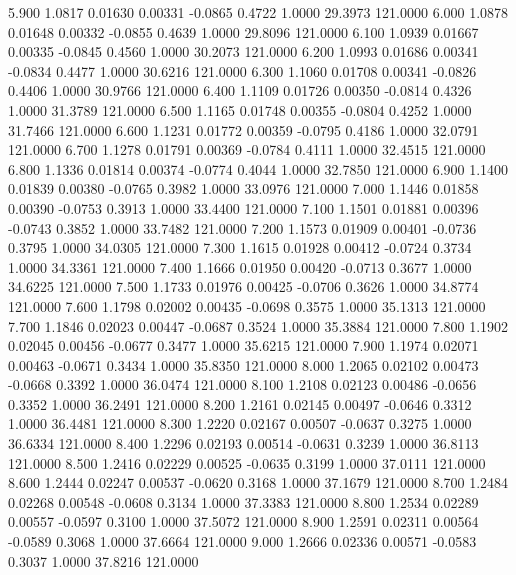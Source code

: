    5.900   1.0817   0.01630   0.00331  -0.0865   0.4722   1.0000  29.3973 121.0000
   6.000   1.0878   0.01648   0.00332  -0.0855   0.4639   1.0000  29.8096 121.0000
   6.100   1.0939   0.01667   0.00335  -0.0845   0.4560   1.0000  30.2073 121.0000
   6.200   1.0993   0.01686   0.00341  -0.0834   0.4477   1.0000  30.6216 121.0000
   6.300   1.1060   0.01708   0.00341  -0.0826   0.4406   1.0000  30.9766 121.0000
   6.400   1.1109   0.01726   0.00350  -0.0814   0.4326   1.0000  31.3789 121.0000
   6.500   1.1165   0.01748   0.00355  -0.0804   0.4252   1.0000  31.7466 121.0000
   6.600   1.1231   0.01772   0.00359  -0.0795   0.4186   1.0000  32.0791 121.0000
   6.700   1.1278   0.01791   0.00369  -0.0784   0.4111   1.0000  32.4515 121.0000
   6.800   1.1336   0.01814   0.00374  -0.0774   0.4044   1.0000  32.7850 121.0000
   6.900   1.1400   0.01839   0.00380  -0.0765   0.3982   1.0000  33.0976 121.0000
   7.000   1.1446   0.01858   0.00390  -0.0753   0.3913   1.0000  33.4400 121.0000
   7.100   1.1501   0.01881   0.00396  -0.0743   0.3852   1.0000  33.7482 121.0000
   7.200   1.1573   0.01909   0.00401  -0.0736   0.3795   1.0000  34.0305 121.0000
   7.300   1.1615   0.01928   0.00412  -0.0724   0.3734   1.0000  34.3361 121.0000
   7.400   1.1666   0.01950   0.00420  -0.0713   0.3677   1.0000  34.6225 121.0000
   7.500   1.1733   0.01976   0.00425  -0.0706   0.3626   1.0000  34.8774 121.0000
   7.600   1.1798   0.02002   0.00435  -0.0698   0.3575   1.0000  35.1313 121.0000
   7.700   1.1846   0.02023   0.00447  -0.0687   0.3524   1.0000  35.3884 121.0000
   7.800   1.1902   0.02045   0.00456  -0.0677   0.3477   1.0000  35.6215 121.0000
   7.900   1.1974   0.02071   0.00463  -0.0671   0.3434   1.0000  35.8350 121.0000
   8.000   1.2065   0.02102   0.00473  -0.0668   0.3392   1.0000  36.0474 121.0000
   8.100   1.2108   0.02123   0.00486  -0.0656   0.3352   1.0000  36.2491 121.0000
   8.200   1.2161   0.02145   0.00497  -0.0646   0.3312   1.0000  36.4481 121.0000
   8.300   1.2220   0.02167   0.00507  -0.0637   0.3275   1.0000  36.6334 121.0000
   8.400   1.2296   0.02193   0.00514  -0.0631   0.3239   1.0000  36.8113 121.0000
   8.500   1.2416   0.02229   0.00525  -0.0635   0.3199   1.0000  37.0111 121.0000
   8.600   1.2444   0.02247   0.00537  -0.0620   0.3168   1.0000  37.1679 121.0000
   8.700   1.2484   0.02268   0.00548  -0.0608   0.3134   1.0000  37.3383 121.0000
   8.800   1.2534   0.02289   0.00557  -0.0597   0.3100   1.0000  37.5072 121.0000
   8.900   1.2591   0.02311   0.00564  -0.0589   0.3068   1.0000  37.6664 121.0000
   9.000   1.2666   0.02336   0.00571  -0.0583   0.3037   1.0000  37.8216 121.0000
